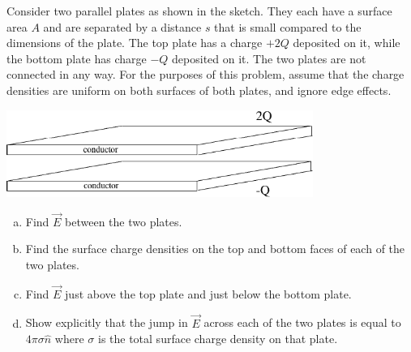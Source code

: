 \documentclass[makesolutionspdf]{esg8022pset}
\begin{document}
\begin{problem}{}
  Consider two parallel plates as shown in the sketch.  They each have a surface area $A$ and are separated by a distance $s$ that is small compared to the dimensions of the plate.  The top plate has a charge $+2Q$ deposited on it, while the bottom plate has charge $-Q$ deposited on it.  The two plates are not connected in any way.  For the purposes of this problem, assume that the charge densities are uniform on both surfaces of both plates, and ignore edge effects.
  \begin{center}\includegraphics[width=0.75\textwidth]{ps07_08}\end{center}
  \begin{enumerate}[(a)]
    \item Find $\vec E$ between the two plates.
    \item Find the surface charge densities on the top and bottom faces of each of the two plates.
    \item Find $\vec E$ just above the top plate and just below the bottom plate.
    \item Show explicitly that the jump in $\vec E$ across each of the two plates is equal to $4\pi \sigma \hat n$ where $\sigma$ is the total surface charge density on that plate.
  \end{enumerate}
\end{problem}
\end{document}
